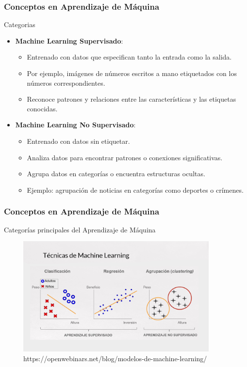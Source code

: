 \documentclass{beamer}
\begin{document}
\begin{frame}
	\frametitle{Conceptos en Aprendizaje de Máquina}
		\begin{block}{Categorias}
	
	\begin{itemize}
		\item \textbf{Machine Learning Supervisado}:
		\begin{itemize}
			\item Entrenado con datos que especifican tanto la entrada como la salida.
			\item Por ejemplo, imágenes de números escritos a mano etiquetados con los números correspondientes.
			\item Reconoce patrones y relaciones entre las características y las etiquetas conocidas.
		\end{itemize}
		
		\item \textbf{Machine Learning No Supervisado}:
		\begin{itemize}
			\item Entrenado con datos sin etiquetar.
			\item Analiza datos para encontrar patrones o conexiones significativas.
			\item Agrupa datos en categorías o encuentra estructuras ocultas.
			\item Ejemplo: agrupación de noticias en categorías como deportes o crímenes.
		\end{itemize}
	\end{itemize}
		\end{block}
\end{frame}

\begin{frame}
	\frametitle{Conceptos en Aprendizaje de Máquina}
\begin{block}{Categorías principales del Aprendizaje de Máquina}	
\begin{figure}
	\includegraphics[width=0.9\textwidth]{supervisado_nosupervisado.png}
	\caption{https://openwebinars.net/blog/modelos-de-machine-learning/}
\end{figure}
\end{block}
\end{frame}
\end{document}
